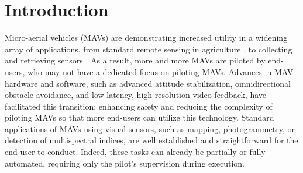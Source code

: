 \begin{abstract}
Enabling \acp{MAV} to physically interact with their environment will usher in the next stage of \ac{MAV} utility and applications. Complex tasks, such as sensor deployment and retrieval, can be realized relatively simply, by relying on a mechanically passive system designed with the user in mind, these payloads can enable such applications to be more widely available and inclusive to end-users.
\end{abstract}



\section{Introduction}

Micro-aerial vehicles (\acp{MAV}) are demonstrating increased utility in a widening array of applications, from standard remote sensing in agriculture \cite{Zhang2022}, to collecting and retrieving sensors \cite{Geckeler2022a, Geckeler2023a}. As a result, more and more \acp{MAV} are piloted by end-users, who may not have a dedicated focus on piloting \acp{MAV}. Advances in \ac{MAV} hardware and software, such as advanced attitude stabilization, omnidirectional obstacle avoidance, and low-latency, high resolution video feedback, have facilitated this transition; enhancing safety and reducing the complexity of piloting \acp{MAV} so that more end-users can utilize this technology. Standard applications of \acp{MAV} using visual sensors, such as mapping, photogrammetry, or detection of multispectral indices, are well established and straightforward for the end-user to conduct. Indeed, these tasks can already be partially or fully automated, requiring only the pilot's supervision during execution.

